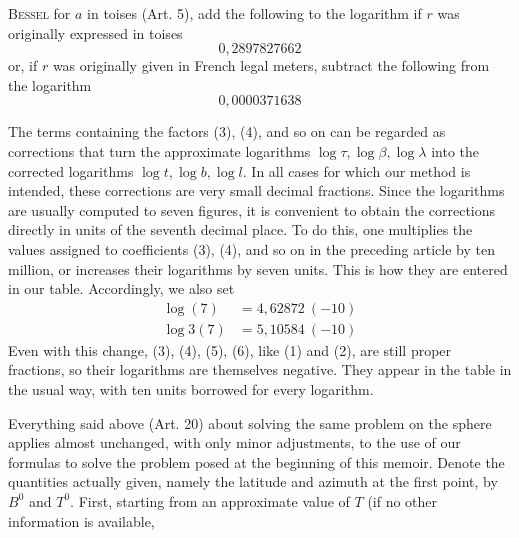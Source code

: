%
\textsc{Bessel} for \(a\) in toises (Art. 5), add the following to the logarithm if \(r\) was originally expressed in toises
\[
0{,}2897827662
\]
or, if \(r\) was originally given in French legal meters, subtract the following from the logarithm
\[
0{,}0000371638
\]

The terms containing the factors (3), (4), and so on can be regarded as corrections that turn the approximate logarithms \(\log\tau,\log\beta,\log\lambda\) into the corrected logarithms \(\log t,\log b,\log l\). In all cases for which our method is intended, these corrections are very small decimal fractions. Since the logarithms are usually computed to seven figures, it is convenient to obtain the corrections directly in units of the seventh decimal place. To do this, one multiplies the values assigned to coefficients (3), (4), and so on in the preceding article by ten million, or increases their logarithms by seven units. This is how they are entered in our table. Accordingly, we also set
\[
\begin{aligned}
\log(7)&=4{,}62872\ (-10)\\
\log3(7)&=5{,}10584\ (-10)
\end{aligned}
\]
Even with this change, (3), (4), (5), (6), like (1) and (2), are still proper fractions, so their logarithms are themselves negative. They appear in the table in the usual way, with ten units borrowed for every logarithm.

Everything said above (Art. 20) about solving the same problem on the sphere applies almost unchanged, with only minor adjustments, to the use of our formulas to solve the problem posed at the beginning of this memoir. Denote the quantities actually given, namely the latitude and azimuth at the first point, by \(B^0\) and \(T^0\). First, starting from an approximate value of \(T\) (if no other information is available, %
